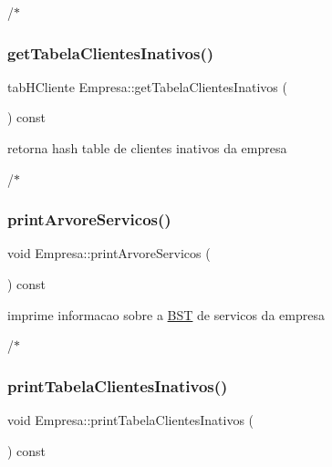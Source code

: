 /$\ast$ \mbox{\label{class_empresa_aeb8ed69f2ec85275de6372e18a8945db}} 
\subsubsection{\texorpdfstring{get\+Tabela\+Clientes\+Inativos()}{getTabelaClientesInativos()}}
{\footnotesize\ttfamily tab\+H\+Cliente Empresa\+::get\+Tabela\+Clientes\+Inativos (\begin{DoxyParamCaption}{ }\end{DoxyParamCaption}) const}



retorna hash table de clientes inativos da empresa 

/$\ast$ \mbox{\label{class_empresa_a7e760a09feabb76e7ab0b121be61be4a}} 
\subsubsection{\texorpdfstring{print\+Arvore\+Servicos()}{printArvoreServicos()}}
{\footnotesize\ttfamily void Empresa\+::print\+Arvore\+Servicos (\begin{DoxyParamCaption}{ }\end{DoxyParamCaption}) const}



imprime informacao sobre a \hyperlink{class_b_s_t}{B\+ST} de servicos da empresa 

/$\ast$ \mbox{\label{class_empresa_a232b5da45afd7aad19ab503210b0c922}} 
\subsubsection{\texorpdfstring{print\+Tabela\+Clientes\+Inativos()}{printTabelaClientesInativos()}}
{\footnotesize\ttfamily void Empresa\+::print\+Tabela\+Clientes\+Inativos (\begin{DoxyParamCaption}{ }\end{DoxyParamCaption}) const}



